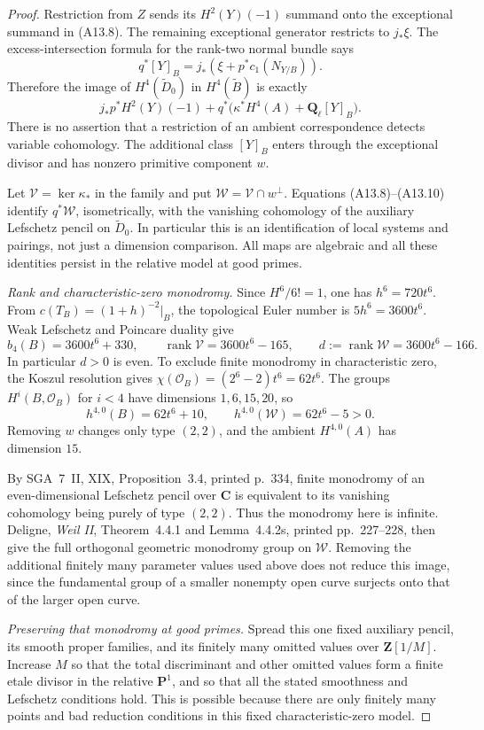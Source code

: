 \documentclass[11pt]{article}
\theoremstyle{remark}\newtheorem{remark}[theorem]{Remark}
\begin{document}
\begin{proof}
Restriction from $Z$ sends its $H^2(Y)(-1)$ summand onto the
exceptional summand in (A13.8). The remaining exceptional
generator restricts to $j_*\xi$. The excess-intersection formula
for the rank-two normal bundle says
\[
 q^*[Y]_B=j_*(\xi+p^*c_1(N_{Y/B})).
 \tag{A13.9}
\]
Therefore the image of $H^4(\widetilde D_0)$ in
$H^4(\widetilde B)$ is exactly
\[
 j_*p^*H^2(Y)(-1)
  +q^*\bigl(\kappa^*H^4(A)+\mathbf Q_\ell[Y]_B\bigr).
 \tag{A13.10}
\]
There is no assertion that a restriction of an ambient
correspondence detects variable cohomology. The additional
class $[Y]_B$ enters through the exceptional divisor and has
nonzero primitive component $w$.

Let $\mathcal V=\ker\kappa_*$ in the family and put
$\mathcal W=\mathcal V\cap w^\perp$.
Equations (A13.8)--(A13.10) identify $q^*\mathcal W$, isometrically,
with the vanishing cohomology of the auxiliary Lefschetz pencil
on $\widetilde D_0$. In particular this is an identification of
local systems and pairings, not just a dimension comparison.
All maps are algebraic and all these identities persist in the
relative model at good primes.

\emph{Rank and characteristic-zero monodromy.}
Since $H^6/6!=1$, one has $h^6=720t^6$.
From $c(T_B)=(1+h)^{-2}|_B$, the topological Euler number is
$5h^6=3600t^6$. Weak Lefschetz and Poincare duality give
\[
 b_4(B)=3600t^6+330,\qquad
 \operatorname{rank}\mathcal V=3600t^6-165,\qquad
 d:=\operatorname{rank}\mathcal W=3600t^6-166.
 \tag{A13.11}
\]
In particular $d>0$ is even. To exclude finite monodromy in
characteristic zero, the Koszul resolution gives
$\chi(\mathcal O_B)=(2^6-2)t^6=62t^6$.
The groups $H^i(B,\mathcal O_B)$ for $i<4$ have dimensions
$1,6,15,20$, so
\[
 h^{4,0}(B)=62t^6+10,\qquad
 h^{4,0}(\mathcal W)=62t^6-5>0.
 \tag{A13.12}
\]
Removing $w$ changes only type $(2,2)$, and the ambient
$H^{4,0}(A)$ has dimension $15$.

By SGA~7~II, XIX, Proposition~3.4, printed p.~334, finite
monodromy of an even-dimensional Lefschetz pencil over
$\mathbf C$ is equivalent to its vanishing cohomology being
purely of type $(2,2)$. Thus the monodromy here is infinite.
Deligne, \emph{Weil II}, Theorem~4.4.1 and Lemma~4.4.2s,
printed pp.~227--228, then give the full orthogonal geometric
monodromy group on $\mathcal W$.
Removing the additional finitely many parameter values used
above does not reduce this image, since the fundamental group
of a smaller nonempty open curve surjects onto that of the
larger open curve.

\emph{Preserving that monodromy at good primes.}
Spread this one fixed auxiliary pencil, its smooth proper
families, and its finitely many omitted values over
$\mathbf Z[1/M]$. Increase $M$ so that the total discriminant
and other omitted values form a finite etale divisor in the
relative $\mathbf P^1$, and so that all the stated smoothness
and Lefschetz conditions hold. This is possible because there
are only finitely many points and bad reduction conditions
in this fixed characteristic-zero model.


\end{proof}
\end{document}
